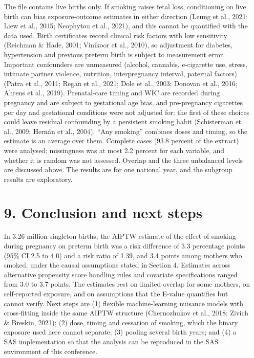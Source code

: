 \documentclass[11pt,letterpaper]{article}
\begin{document}
The file contains live births only. If smoking raises fetal loss, conditioning on live birth can bias exposure-outcome estimates in either direction (Leung et al., 2021; Liew et al., 2015; Neophytou et al., 2021), and this cannot be quantified with the data used. Birth certificates record clinical risk factors with low sensitivity (Reichman \& Hade, 2001; Vinikoor et al., 2010), so adjustment for diabetes, hypertension and previous preterm birth is subject to measurement error. Important confounders are unmeasured (alcohol, cannabis, e-cigarette use, stress, intimate partner violence, nutrition, interpregnancy interval, paternal factors) (Patra et al., 2011; Regan et al., 2021; Dole et al., 2003; Donovan et al., 2016; Ahrens et al., 2019). Prenatal-care timing and WIC are recorded during pregnancy and are subject to gestational age bias, and pre-pregnancy cigarettes per day and gestational conditions were not adjusted for; the first of these choices could leave residual confounding by a persistent smoking habit (Schisterman et al., 2009; Hernán et al., 2004). ``Any smoking'' combines doses and timing, so the estimate is an average over them. Complete cases (93.8 percent of the extract) were analysed; missingness was at most 2.2 percent for each variable, and whether it is random was not assessed. Overlap and the three unbalanced levels are discussed above. The results are for one national year, and the subgroup results are exploratory.

\section*{9. Conclusion and next steps}

In 3.26 million singleton births, the AIPTW estimate of the effect of smoking during pregnancy on preterm birth was a risk difference of 3.3 percentage points (95\% CI 2.5 to 4.0) and a risk ratio of 1.39, and 3.4 points among mothers who smoked, under the causal assumptions stated in Section 4. Estimates across alternative propensity score handling rules and covariate specifications ranged from 3.0 to 3.7 points. The estimates rest on limited overlap for some mothers, on self-reported exposure, and on assumptions that the E-value quantifies but cannot verify. Next steps are (1) flexible machine-learning nuisance models with cross-fitting inside the same AIPTW structure (Chernozhukov et al., 2018; Zivich \& Breskin, 2021); (2) dose, timing and cessation of smoking, which the binary exposure used here cannot separate; (3) pooling several birth years; and (4) a SAS implementation so that the analysis can be reproduced in the SAS environment of this conference.
\end{document}
